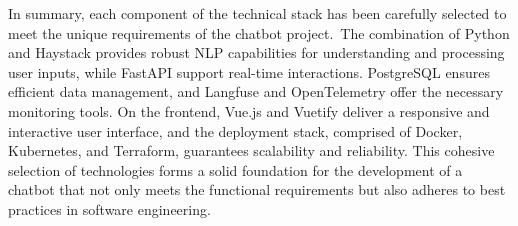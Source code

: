 \vspace{1cm}

In summary, each component of the technical stack has been carefully selected to meet the unique requirements of the
chatbot project.\ The combination of Python and Haystack provides robust NLP capabilities for understanding and
processing user inputs, while FastAPI support real-time interactions.
PostgreSQL ensures efficient data
management, and Langfuse and OpenTelemetry offer the necessary monitoring tools.
On the frontend, Vue.js and Vuetify deliver a responsive and interactive user interface, and the deployment stack,
comprised of Docker, Kubernetes, and
Terraform, guarantees scalability and reliability.
This cohesive selection of technologies forms a solid foundation for the development of a chatbot that not only meets
the functional requirements but also adheres to best practices in
software engineering.
